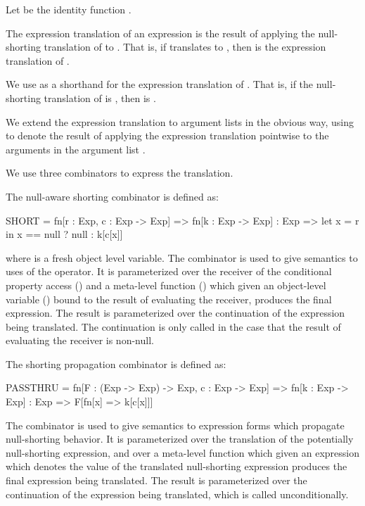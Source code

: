 \documentclass[makeidx]{article}
\begin{document}
Let  be the identity function .

The expression translation of an expression  is the result of applying the
null-shorting translation of  to .  That is, if  translates to ,
then  is the expression translation of .

We use  as a shorthand for the expression translation of .  That is,
if the null-shorting translation of  is , then  is .

We extend the expression translation to argument lists in the obvious way, using
 to denote the result of applying the expression translation
pointwise to the arguments in the argument list .

We use three combinators to express the translation.

The null-aware shorting combinator  is defined as:
\begin{dartCode}
  SHORT = fn[r : Exp, c : Exp -> Exp] =>
              fn[k : Exp -> Exp] : Exp =>
                let x = r in x == null ? null : k[c[x]]
\end{dartCode}

where  is a fresh object level variable.  The  combinator is used to
give semantics to uses of the  operator.  It is parameterized over the
receiver of the conditional property access () and a meta-level function
() which given an object-level variable () bound to the result of
evaluating the receiver, produces the final expression.  The result is
parameterized over the continuation of the expression being translated.  The
continuation is only called in the case that the result of evaluating the
receiver is non-null.

The shorting propagation combinator  is defined as:
\begin{dartCode}
  PASSTHRU = fn[F : (Exp -> Exp) -> Exp, c : Exp -> Exp] =>
               fn[k : Exp -> Exp] : Exp => F[fn[x] => k[c[x]]]
\end{dartCode}

The  combinator is used to give semantics to expression forms which
propagate null-shorting behavior.  It is parameterized over the translation 
of the potentially null-shorting expression, and over a meta-level function 
which given an expression which denotes the value of the translated
null-shorting expression produces the final expression being translated.  The
result is parameterized over the continuation of the expression being
translated, which is called unconditionally.
\end{document}
